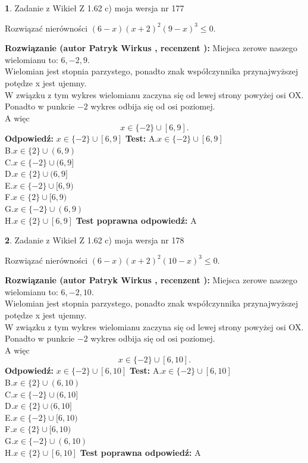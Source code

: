 \documentclass[12pt, a4paper]{article}
\theoremstyle{definition} %
\newtheorem{zad}{}
\newcommand{\zadStart}[1]{\begin{zad}#1\newline}
\newcommand{\zadStop}{\end{zad}}
\newcommand{\rozwStart}[2]{\noindent \textbf{Rozwiązanie (autor #1 , recenzent #2): }\newline}
\newcommand{\rozwStop}{\newline}
\newcommand{\odpStart}{\noindent \textbf{Odpowiedź:}\newline}
\newcommand{\odpStop}{\newline}
\newcommand{\testStart}{\noindent \textbf{Test:}\newline}
\newcommand{\testStop}{\newline}
\newcommand{\kluczStart}{\noindent \textbf{Test poprawna odpowiedź:}\newline}
\newcommand{\kluczStop}{\newline}
\begin{document}
\zadStart{Zadanie z Wikieł Z 1.62 c) moja wersja nr 177}

Rozwiązać nierówności $(6-x)(x+2)^{2}(9-x)^{3}\le0$.
\zadStop
\rozwStart{Patryk Wirkus}{}
Miejsca zerowe naszego wielomianu to: $6, -2, 9$.\\
Wielomian jest stopnia parzystego, ponadto znak współczynnika przy\linebreak najwyższej potędze x jest ujemny.\\ W związku z tym wykres wielomianu zaczyna się od lewej strony powyżej osi OX.\\
Ponadto w punkcie $-2$ wykres odbija się od osi poziomej.\\
A więc $$x \in \{-2\} \cup [6,9].$$
\rozwStop
\odpStart
$x \in \{-2\} \cup [6,9]$
\odpStop
\testStart
A.$x \in \{-2\} \cup [6,9]$\\
B.$x \in \{2\} \cup (6,9)$\\
C.$x \in \{-2\} \cup (6,9]$\\
D.$x \in \{2\} \cup (6,9]$\\
E.$x \in \{-2\} \cup [6,9)$\\
F.$x \in \{2\} \cup [6,9)$\\
G.$x \in \{-2\} \cup (6,9)$\\
H.$x \in \{2\} \cup [6,9]$
\testStop
\kluczStart
A
\kluczStop



\zadStart{Zadanie z Wikieł Z 1.62 c) moja wersja nr 178}

Rozwiązać nierówności $(6-x)(x+2)^{2}(10-x)^{3}\le0$.
\zadStop
\rozwStart{Patryk Wirkus}{}
Miejsca zerowe naszego wielomianu to: $6, -2, 10$.\\
Wielomian jest stopnia parzystego, ponadto znak współczynnika przy\linebreak najwyższej potędze x jest ujemny.\\ W związku z tym wykres wielomianu zaczyna się od lewej strony powyżej osi OX.\\
Ponadto w punkcie $-2$ wykres odbija się od osi poziomej.\\
A więc $$x \in \{-2\} \cup [6,10].$$
\rozwStop
\odpStart
$x \in \{-2\} \cup [6,10]$
\odpStop
\testStart
A.$x \in \{-2\} \cup [6,10]$\\
B.$x \in \{2\} \cup (6,10)$\\
C.$x \in \{-2\} \cup (6,10]$\\
D.$x \in \{2\} \cup (6,10]$\\
E.$x \in \{-2\} \cup [6,10)$\\
F.$x \in \{2\} \cup [6,10)$\\
G.$x \in \{-2\} \cup (6,10)$\\
H.$x \in \{2\} \cup [6,10]$
\testStop
\kluczStart
A
\kluczStop
\end{document}
